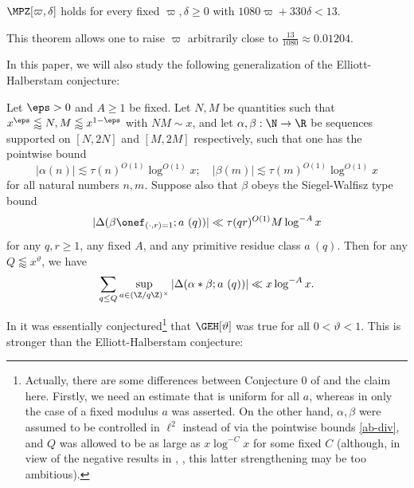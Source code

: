 \begin{theorem}\label{mpz-poly-improv}  $\MPZ[\varpi,\delta]$ holds for every fixed $\varpi,\delta \geq 0$ with $1080 \varpi + 330 \delta < 13$.
\end{theorem}

This theorem allows one to raise $\varpi$ arbitrarily close to $\frac{13}{1080} \approx 0.01204$.


In this paper, we will also study the following generalization of the Elliott-Halberstam conjecture:

\begin{claim}\label{geh-def}  Let $\eps > 0$ and $A \geq 1$ be fixed.  Let $N,M$ be quantities such that
$x^\eps \lessapprox N,M \lessapprox x^{1-\eps}$ with $NM \sim x$, and let $\alpha, \beta: \N \to \R$ be sequences supported on $[N,2N]$ and $[M,2M]$ respectively, such that one has the pointwise bound
\begin{equation}\label{ab-div}
 |\alpha(n)| \lesssim \tau(n)^{O(1)} \log^{O(1)} x; \quad |\beta(m)| \lesssim \tau(m)^{O(1)} \log^{O(1)} x
\end{equation}
for all natural numbers $n,m$.  Suppose also that $\beta$ obeys the Siegel-Walfisz type bound
\begin{equation}\label{sig}
| \Delta(\beta \onef_{(\cdot,r)=1}; a\ (q)) | \ll \tau(qr)^{O(1)} M \log^{-A} x 
\end{equation}
for any $q,r \geq 1$, any fixed $A$, and any primitive residue class $a\ (q)$.  Then for any $Q \lessapprox x^\vartheta$, we have
\begin{equation}\label{qq-gen}
 \sum_{q \leq Q} \sup_{a \in (\Z/q\Z)^\times} |\Delta(\alpha \ast \beta; a\ (q))| \ll x \log^{-A} x.
\end{equation} 
\end{claim}

In \cite[Conjecture 0]{bfi} it was essentially conjectured\footnote{Actually, there are some differences between Conjecture 0 of \cite{bfi} and the claim here.  Firstly, we need an estimate that is uniform for all $a$, whereas in \cite{bfi} only the case of a fixed modulus $a$ was asserted.  On the other hand, $\alpha,\beta$ were assumed to be controlled in $\ell^2$ instead of via the pointwise bounds \eqref{ab-div}, and $Q$ was allowed to be as large as $x \log^{-C} x$ for some fixed $C$ (although, in view of the negative results in \cite{fg}, \cite{fghm}, this latter strengthening may be too ambitious).} that $\GEH[\vartheta]$ was true for all $0 < \vartheta < 1$.   This is stronger than the Elliott-Halberstam conjecture:

